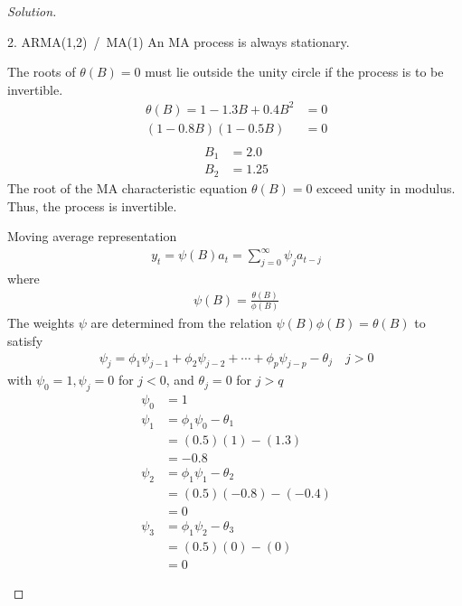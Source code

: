 \documentclass[UTF8,a4paper,14pt]{ctexart}
\newenvironment{solution}
  {\renewcommand\qedsymbol{$\blacksquare$}\begin{proof}[Solution]}
  {\end{proof}}
\theoremstyle{definition}
\theoremstyle{remark}
\begin{document}
\begin{solution}
\begin{mybox}{2. ARMA(1,2) \,/\, MA(1)}
    An MA process is always stationary.

    The roots of \(\theta(B) = 0\) must lie outside the unity circle if the process is to be invertible.
    \begin{equation}\
      \begin{aligned}
        \theta(B)=1-1.3B+0.4B^2&=0\\
        (1-0.8B)(1-0.5B)&=0\\
      \end{aligned}
    \end{equation}
    \begin{equation}\
      \begin{aligned}
        B_1 &=2.0\\
        B_2 &= 1.25
      \end{aligned}
    \end{equation}
    The root of the MA characteristic equation \(\theta(B) = 0\) exceed unity in modulus. Thus, the process is invertible.
      
    \tcbsubtitle{\(\psi\) weights}
    Moving average representation
    \begin{equation}\
      \begin{aligned}
      y_t = \psi(B)a_t =\sum_{j = 0}^{\infty} \psi_j a_{t-j} 
      \end{aligned}
    \end{equation}
    where
      \begin{equation}\
        \begin{aligned}
        \psi(B) = \frac{\theta(B)}{\phi(B)}
        \end{aligned}
      \end{equation}
      The weights \(\psi\) are determined from the relation \(\psi(B) \phi(B)= \theta(B)\) to satisfy
      \begin{equation}\
        \begin{aligned}
        \psi_j = \phi_1\psi_{j-1}+\phi_2\psi_{j-2}+\cdots+\phi_p\psi_{j-p}-\theta_j\quad j>0
        \end{aligned}
      \end{equation}
      with \(\psi_0 = 1, \psi_j = 0\) for \(j<0\), and \(\theta_j = 0\) for \(j>q\)
      \begin{equation}\
        \begin{aligned}
        \psi_0 &= 1\\
        \psi_1 &= \phi_1\psi_0-\theta_1\\
        &=(0.5)(1)-(1.3)\\
        &=-0.8\\
        \psi_2 &= \phi_1\psi_1-\theta_2\\
        &=(0.5)(-0.8)-(-0.4)\\
        &=0\\
        \psi_3 &= \phi_1\psi_2-\theta_3\\
        &=(0.5)(0)-(0)\\
        &=0
      \end{aligned}
      \end{equation}


\end{mybox}
\end{solution}
\end{document}
